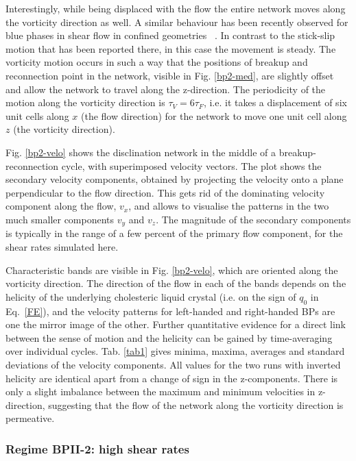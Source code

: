 \documentclass[aps,pre,reprint,superscriptaddress, twocolumn]{revtex4}
\begin{document}
Interestingly, while being displaced with the flow the entire network moves 
along the vorticity direction as well.  A similar behaviour has been recently 
observed for blue phases in shear flow in confined geometries ~\cite{Henrich:2012b}.
In contrast to the stick-slip motion that has been reported there,
in this case the movement is steady. 
The vorticity motion occurs in such a way that the positions of breakup and reconnection 
point in the network, visible in Fig. \ref{bp2-med}, are slightly offset and allow the network 
to travel along the z-direction. The periodicity of the motion along the vorticity direction
is $\tau_V=6\tau_F$, 
i.e. it takes a displacement of six unit cells along $x$ (the flow direction) 
for the network to move one unit cell along $z$ (the vorticity direction).

Fig. \ref{bp2-velo} shows the disclination network in the middle of a breakup-reconnection
cycle, with superimposed velocity vectors.
The plot shows the secondary velocity components, obtained by projecting the
velocity onto a plane perpendicular to the flow direction.
This gets rid of the dominating velocity component along the flow, $v_x$, and 
allows to visualise the patterns in the 
two much smaller components $v_y$ and $v_z$.
The magnitude of the secondary components is typically in the range of a 
few percent of the primary flow component, for the shear rates simulated here.

Characteristic bands are visible in Fig. \ref{bp2-velo}, which are 
oriented along the vorticity direction. The direction of the flow
in each of the bands depends on the helicity of the underlying cholesteric
liquid crystal (i.e. on the sign of $q_0$ in Eq.~\ref{FE}), and the velocity
patterns for left-handed and right-handed BPs are one the mirror image of
the other. 
Further quantitative evidence for a direct link between the sense of motion 
and the helicity can be gained by time-averaging over individual cycles.
Tab. \ref{tab1} gives minima, maxima, averages and standard deviations 
of the velocity components.
All values for the two runs with inverted helicity are identical apart 
from a change of sign in the z-components.
There is only a slight imbalance between the maximum and minimum velocities 
in z-direction, suggesting that the flow of the network along the vorticity 
direction is permeative. 

\subsubsection{Regime BPII-2: high shear rates}
\end{document}
